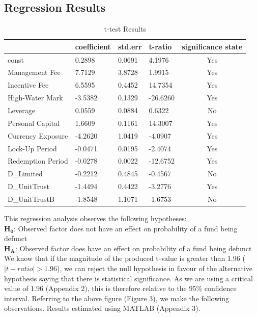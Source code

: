 \documentclass[11pt, english]{article}
\begin{document}
	\newpage

	\subsection{Regression Results}

	\begin{table}[h]
		\scriptsize
		\renewcommand{\arraystretch}{1.25}
	\begin{center}
	\begin{tabular}{p{3cm}p{1.75cm}p{1.75cm}p{2cm}c}
		& \textbf{coefficient} & \textbf{std.err} & \textbf{t-ratio} & \textbf{significance state}\\
		\hline
		const & 0.2898 & 0.0691 & 4.1976 & Yes\\
		Management Fee & 7.7129 & 3.8728 & 1.9915 & Yes\\
		Incentive Fee & 6.5595 & 0.4452 & 14.7354 & Yes\\
		High-Water Mark & -3.5382 & 0.1329 & -26.6260 & Yes\\
		Leverage & 0.0559 & 0.0884 & 0.6322 & No\\
		Personal Capital & 1.6609 & 0.1161 & 14.3007 & Yes\\
		Currency Exposure & -4.2620 & 1.0419 & -4.0907 & Yes\\
		Lock-Up Period & -0.0471 & 0.0195 & -2.4074 & Yes\\
		Redemption Period & -0.0278 & 0.0022 & -12.6752 & Yes\\
		D\_Limited & -0.2212 & 0.4845 & -0.4567 & No\\
		D\_UnitTrust & -1.4494 & 0.4422 & -3.2776 & Yes\\
		D\_UnitTrustB & -1.8548 & 1.1071 & -1.6753 & No\\
		\hline
	\end{tabular}
		\caption{t-test Results}
	\end{center}
	\end{table}

	This regression analysis observes the following hypotheses:\\

	\textbf{H}$\mathbf{_0}$: Observed factor does not have an effect on probability of a fund being defunct\\
	\textbf{H}$\mathbf{_A}$: Observed factor does have an effect on probability of a fund being defunct\\

	We know that if the magnitude of the produced t-value is greater than 1.96 ($|t-ratio|>1.96$), we can reject the null hypothesis in favour of the alternative hypothesis saying that there is statistical significance. As we are using a critical value of 1.96 (Appendix 2), this is therefore relative to the 95\% confidence interval. Referring to the above figure (Figure 3), we make the following observations. Results estimated using MATLAB (Appendix 3).
\end{document}
